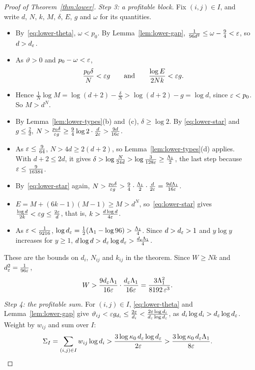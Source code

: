 \begin{proof}[Proof of Theorem~\ref{thm:lower}]
\emph{Step 3: a profitable block.} Fix \((i,j)\in I\), and write \(d\),
\(N\), \(k\), \(M\), \(\delta\), \(E\), \(g\) and \(\omega\) for its
quantities.
\begin{itemize}
\item By~\eqref{eq:lower-theta}, \(\omega<p_0\). By
Lemma~\ref{lem:lower-gap}, \(\frac1{96d^2}\le\omega-\frac94<\varepsilon\), so
\(d>d_\varepsilon\).
\item As \(\vartheta>0\) and \(p_0-\omega<\varepsilon\),
\begin{equation}\label{eq:lower-star}
 \frac{p_0\delta}N<\varepsilon g\qquad\text{and}\qquad\frac{\log E}{2Nk}<\varepsilon g .
\end{equation}
\item Hence \(\frac1N\log M=\log(d+2)-\frac\delta N>\log(d+2)-g=\log d\),
since \(\varepsilon<p_0\). So \(M>d^N\).
\item By Lemma~\ref{lem:lower-types}(b) and~(c), \(\delta\ge\log2\). By
\eqref{eq:lower-star} and \(g\le\frac2d\),
\(N>\frac{p_0\delta}{\varepsilon g}\ge\frac94\log2\cdot\frac d{2\varepsilon}>\frac{9d}{16\varepsilon}\).
\item As \(\varepsilon\le\frac9{64}\), \(N>4d\ge2(d+2)\), so
Lemma~\ref{lem:lower-types}(d) applies. With \(d+2\le2d\), it gives
\(\delta>\log\frac N{24d}>\log\frac3{128\varepsilon}\ge\frac{\Lambda_1}2\), the last step
because \(\varepsilon\le\frac9{16384}\).
\item By~\eqref{eq:lower-star} again,
\(N>\frac{p_0\delta}{\varepsilon g}>\frac94\cdot\frac{\Lambda_1}2\cdot\frac d{2\varepsilon}=\frac{9d\Lambda_1}{16\varepsilon}\).
\item \(E=M+(6k-1)(M-1)\ge M>d^N\), so~\eqref{eq:lower-star} gives
\(\frac{\log d}{2k}<\varepsilon g\le\frac{2\varepsilon}d\), that is,
\(k>\frac{d\log d}{4\varepsilon}\).
\item As \(\varepsilon<\frac1{9216}\), \(\log d_\varepsilon=\frac12(\Lambda_1-\log96)>\frac{\Lambda_1}4\).
Since \(d>d_\varepsilon>1\) and \(y\log y\) increases for \(y\ge1\),
\(d\log d>d_\varepsilon\log d_\varepsilon>\frac{d_\varepsilon\Lambda_1}4\).
\end{itemize}
These are the bounds on \(d_i\), \(N_{ij}\) and \(k_{ij}\) in the theorem.
Since \(W\ge Nk\) and \(d_\varepsilon^2=\frac1{96\varepsilon}\),
\[
 W>\frac{9d_\varepsilon\Lambda_1}{16\varepsilon}\cdot\frac{d_\varepsilon\Lambda_1}{16\varepsilon}=\frac{3\Lambda_1^2}{8192\,\varepsilon^3}.
\]

\emph{Step 4: the profitable sum.} For \((i,j)\in I\),
\eqref{eq:lower-theta} and Lemma~\ref{lem:lower-gap} give
\(\vartheta_{ij}<\varepsilon g_{d_i}\le\frac{2\varepsilon}{d_i}<\frac{2\varepsilon\log d_i}{d_\varepsilon\log d_\varepsilon}\),
as \(d_i\log d_i>d_\varepsilon\log d_\varepsilon\). Weight by \(w_{ij}\) and sum over
\(I\):
\[
 \Sigma_I=\sum_{(i,j)\in I}w_{ij}\log d_i
 >\frac{3\log\kappa_0\,d_\varepsilon\log d_\varepsilon}{2\varepsilon}>\frac{3\log\kappa_0\,d_\varepsilon\Lambda_1}{8\varepsilon}.
\]


\end{proof}
